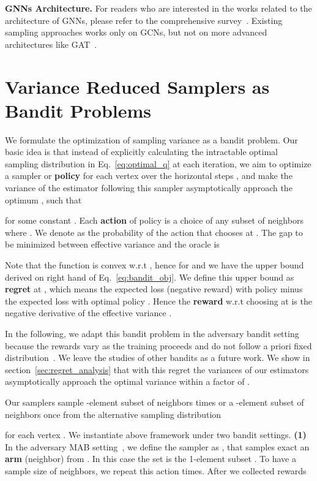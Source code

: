 \documentclass{article}
\begin{document}
{\bfseries GNNs Architecture.} 
For readers who are interested in the works related to the architecture of GNNs, please refer to
the comprehensive survey~\cite{wu2019comprehensive}.
Existing sampling approaches works only on GCNs, but
not on more advanced architectures like GAT~\cite{velivckovic2017graph}.

\section{Variance Reduced Samplers as Bandit Problems}\label{sec:problem}
We formulate the optimization of
sampling variance as a 
bandit problem. Our basic idea is that instead of 
explicitly calculating the intractable
optimal sampling distribution in Eq.~\eqref{eq:optimal_q} 
at each iteration, 
we aim to optimize a sampler or \textbf{policy}  for each vertex
 over the horizontal steps , and make the
variance of the estimator following this sampler
asymptotically approach the optimum 
,
such that 
 
for some constant . 
Each \textbf{action} of policy  is a choice of any 
subset of neighbors 
 where .
We denote  as the probability 
of the action that  chooses  at .
The gap to be minimized between
effective variance and the oracle is

Note that the function 
 is convex w.r.t
, hence for  and  we have the 
upper bound derived on right hand of Eq.~\eqref{eq:bandit_obj}.
We define this upper bound as \textbf{regret} at ,
which means the expected loss (negative
reward) with policy  minus the expected loss with
optimal policy . 
Hence the \textbf{reward} 
w.r.t choosing  at  is the negative 
derivative of the effective variance
.

In the following, we adapt this bandit problem in the adversary bandit 
setting~\cite{auer2002nonstochastic} because the rewards
vary as the training proceeds and do not follow a priori
fixed distribution~\cite{burtini2015survey}. We leave the
studies of other bandits as a future work.
We show in section~\ref{sec:regret_analysis} that 
with this regret the variances of our estimators 
asymptotically approach the optimal 
variance within a factor of .

Our samplers sample -element subset of neighbors  times  
or a -element subset of neighbors once
from the alternative sampling distribution 

for each vertex .
We instantiate above framework under two bandit settings.
\textbf{(1)} In the adversary
MAB setting~\cite{auer2002nonstochastic}, 
we define the sampler  as , that 
samples exact an \textbf{arm} (neighbor) 
 from . 
In this case the set  is
the 1-element subset . To have a sample size of 
neighbors, we repeat this action  times.
After we collected  rewards
 
\end{document}
